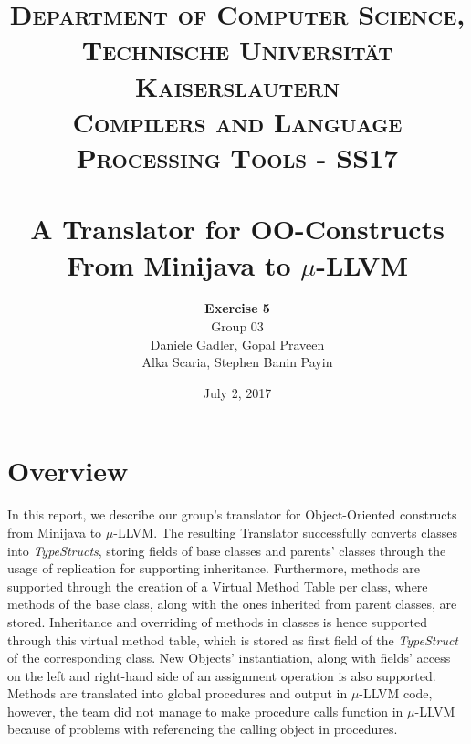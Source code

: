 \documentclass[paper=a4, fontsize=11pt]{scrartcl}
\title{
		\usefont{OT1}{bch}{b}{n}
		\normalfont \normalsize \textsc{Department of Computer Science, Technische Universit\"at Kaiserslautern\\
Compilers and Language Processing Tools - SS17
		} \\ [2pt]
		\horrule{0.5pt} \\[0.4cm]
		\huge A Translator for OO-Constructs\\
		From Minijava to $\mu$-LLVM
		\horrule{2pt} \\[0.5cm]
}
\author{	
		\textbf{Exercise 5}\\
		Group 03\\
        Daniele Gadler, Gopal Praveen\\Alka Scaria, Stephen Banin Payin \\[-1pt]		\normalsize
}
\date{July 2, 2017}
\numberwithin{equation}{section}		%
\numberwithin{figure}{section}			%
\numberwithin{table}{section}				%
\begin{document}
\maketitle

\section*{Overview}
In this report, we describe our group's translator for Object-Oriented constructs from Minijava to $\mu$-LLVM. The resulting Translator successfully converts classes into \textit{TypeStructs}, storing fields of base classes and parents' classes through the usage of replication for supporting inheritance. Furthermore, methods are supported through the creation of a Virtual Method Table per class, where methods of the base class, along with the ones inherited from parent classes, are stored. Inheritance and overriding of methods in classes is hence supported through this virtual method table, which is stored as first field of the \textit{TypeStruct} of the corresponding class. New Objects' instantiation, along with fields' access on the left and right-hand side of an assignment operation is also supported. Methods are translated into global procedures and output in $\mu$-LLVM code, however, the team did not manage to make procedure calls function in $\mu$-LLVM because of problems with referencing the calling object in procedures. 
\end{document}

